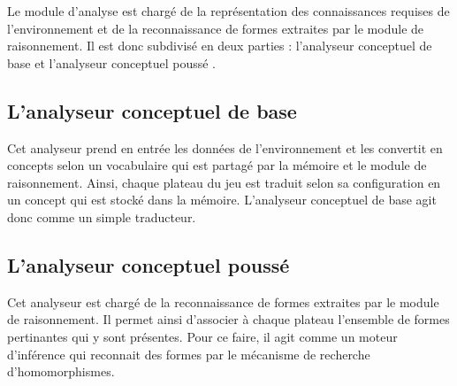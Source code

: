 Le module d'analyse est chargé de la représentation des connaissances requises de l'environnement et de la reconnaissance de formes extraites par le module de raisonnement. Il est donc subdivisé en deux parties : \og l'analyseur conceptuel de base \fg{} et \og l'analyseur conceptuel poussé \fg{}.
\subsection{L'analyseur conceptuel de base}
Cet analyseur prend en entrée les données de l'environnement et les convertit en concepts selon un vocabulaire qui est partagé par la mémoire et le module de raisonnement. Ainsi, chaque plateau du jeu est traduit selon sa configuration en un concept qui est stocké dans la mémoire. L'analyseur conceptuel de base agit donc comme un simple traducteur.
\subsection{L'analyseur conceptuel poussé}
Cet analyseur est chargé de la reconnaissance de formes extraites par le module de raisonnement. Il permet ainsi d'associer à chaque plateau l'ensemble de formes pertinantes qui y sont présentes. Pour ce faire, il agit comme un moteur d'inférence qui reconnait des formes par le mécanisme de recherche d'homomorphismes.
